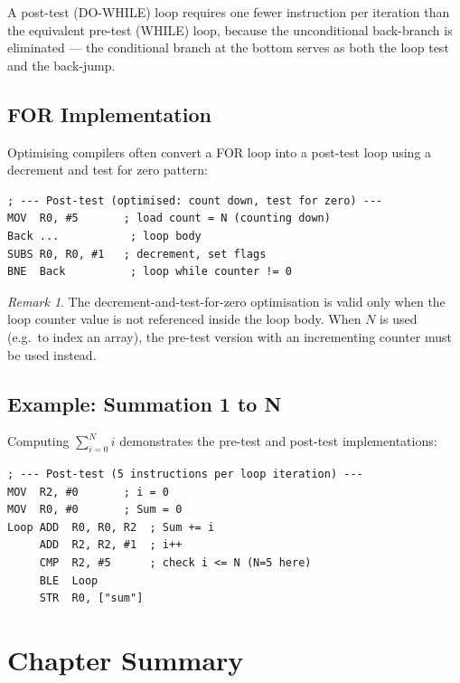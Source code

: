 \documentclass[11pt, a4paper, notitlepage]{report}
\theoremstyle{definition}
\theoremstyle{remark}
\newtheorem{remark}[theorem]{Remark}
\theoremstyle{definition}
\begin{document}
\begin{keyresult}[title={DO-WHILE is More Efficient than WHILE}]
A post-test (DO-WHILE) loop requires one fewer instruction per iteration than the equivalent pre-test (WHILE) loop, because the unconditional back-branch is eliminated --- the conditional branch at the bottom serves as both the loop test and the back-jump.
\end{keyresult}

\subsection{FOR Implementation}

Optimising compilers often convert a FOR loop into a post-test loop using a decrement and test for zero pattern:

\begin{lstlisting}
; --- Post-test (optimised: count down, test for zero) ---
MOV  R0, #5       ; load count = N (counting down)
Back ...           ; loop body
SUBS R0, R0, #1   ; decrement, set flags
BNE  Back          ; loop while counter != 0
\end{lstlisting}

\begin{remark}
The decrement-and-test-for-zero optimisation is valid only when the loop counter value is not referenced inside the loop body. When $N$ is used (e.g.\ to index an array), the pre-test version with an incrementing counter must be used instead.
\end{remark}

\subsection{Example: Summation 1 to N}

Computing $\sum_{i=0}^{N} i$ demonstrates the pre-test and post-test implementations:

\begin{lstlisting}
; --- Post-test (5 instructions per loop iteration) ---
MOV  R2, #0       ; i = 0
MOV  R0, #0       ; Sum = 0
Loop ADD  R0, R0, R2  ; Sum += i
     ADD  R2, R2, #1  ; i++
     CMP  R2, #5      ; check i <= N (N=5 here)
     BLE  Loop
     STR  R0, ["sum"]
\end{lstlisting}

\section{Chapter Summary}
\end{document}
